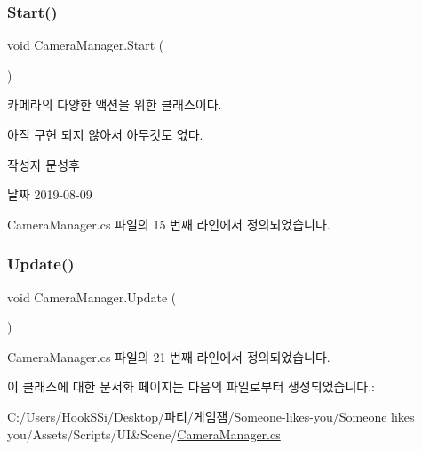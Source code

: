 \subsubsection{\texorpdfstring{Start()}{Start()}}
{\footnotesize\ttfamily void Camera\+Manager.\+Start (\begin{DoxyParamCaption}{ }\end{DoxyParamCaption})\hspace{0.3cm}{\ttfamily [private]}}



카메라의 다양한 액션을 위한 클래스이다. 

아직 구현 되지 않아서 아무것도 없다. \begin{DoxyAuthor}{작성자}
문성후 
\end{DoxyAuthor}
\begin{DoxyDate}{날짜}
2019-\/08-\/09 
\end{DoxyDate}


Camera\+Manager.\+cs 파일의 15 번째 라인에서 정의되었습니다.


\begin{DoxyCode}{0}

\end{DoxyCode}
\mbox{\label{class_camera_manager_a10cfc1f1e06a1ebd569c60b48261a692}} 
\subsubsection{\texorpdfstring{Update()}{Update()}}
{\footnotesize\ttfamily void Camera\+Manager.\+Update (\begin{DoxyParamCaption}{ }\end{DoxyParamCaption})\hspace{0.3cm}{\ttfamily [private]}}



Camera\+Manager.\+cs 파일의 21 번째 라인에서 정의되었습니다.


\begin{DoxyCode}{0}

\end{DoxyCode}


이 클래스에 대한 문서화 페이지는 다음의 파일로부터 생성되었습니다.\+:\begin{DoxyCompactItemize}
\item 
C\+:/\+Users/\+Hook\+S\+Si/\+Desktop/파티/게임잼/\+Someone-\/likes-\/you/\+Someone likes you/\+Assets/\+Scripts/\+U\+I\&\+Scene/\mbox{\hyperlink{_camera_manager_8cs}{Camera\+Manager.\+cs}}\end{DoxyCompactItemize}
